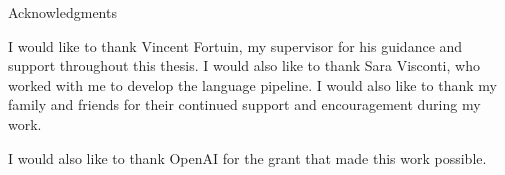 \thispagestyle{empty}

\vspace*{20mm}

\begin{center}
    { Acknowledgments}
\end{center}

\vspace{10mm}

I would like to thank Vincent Fortuin, my supervisor for his guidance and support throughout this thesis. I would also like to thank Sara Visconti,
who worked with me to develop the language pipeline. I would also like to thank my family and friends for their continued support and encouragement during my work.

I would also like to thank OpenAI for the grant that made this work possible.


\cleardoublepage{}

